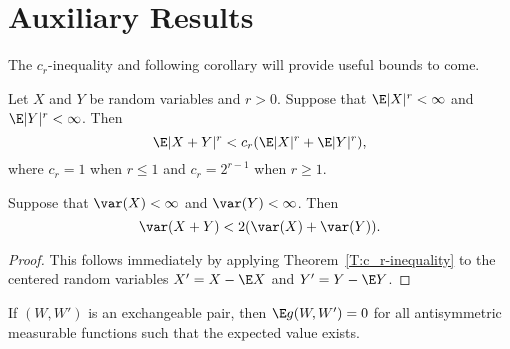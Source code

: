 \chapter{Auxiliary Results}
\label{A:auxiliary-app}

The $c_r$-inequality and following corollary will provide useful
bounds to come.
\begin{theorem}
  \label{T:c_r-inequality}
  Let $X$ and $Y$ be random variables and $r > 0$.  Suppose that
  $\E|X|^r < \infty$ and $\E|Y|^r < \infty$.  Then
  \begin{equation}
    \E|X + Y|^r < c_r(\E|X|^r+\E|Y|^r),
  \end{equation}
  where $c_r = 1$ when $r \leq 1$ and $c_r = 2^{r-1}$ when $r \geq 1$.
\end{theorem}

\begin{corollary}
  \label{C:sum_variance}
  Suppose that $\var(X) < \infty$ and $\var(Y) < \infty$.  Then
  \begin{equation}
    \var(X + Y) < 2(\var(X)+\var(Y)).
  \end{equation}
\end{corollary}
\begin{proof}
  This follows immediately by applying Theorem~\ref{T:c_r-inequality}
  to the centered random variables $X' = X - \E X$ and $Y' = Y -
  \E Y$.
\end{proof}

\begin{lemma}
  \label{L:antisymmetric}
  If $(W, W')$ is an exchangeable pair, then $\E g(W, W') = 0$ for all antisymmetric
  measurable functions such that the expected value exists.
\end{lemma}

